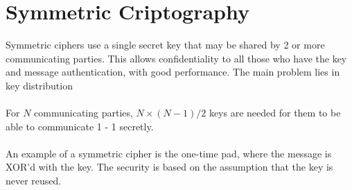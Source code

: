 \documentclass[10pt,a4paper]{report}
\begin{document}
\section{Symmetric Criptography}
Symmetric ciphers use a single secret key that may be shared by 2 or more communicating parties. This allows confidentiality to all those who have the key and message authentication, with good performance. The main problem lies in key distribution\\
\\
For $N$ communicating parties, $N \times (N-1) / 2$ keys are needed for them to be able to communicate 1 - 1 secretly.\\
\\
An example of a symmetric cipher is the one-time pad, where the message is XOR'd with the key. The security is based on the assumption that the key is never reused.
\end{document}
